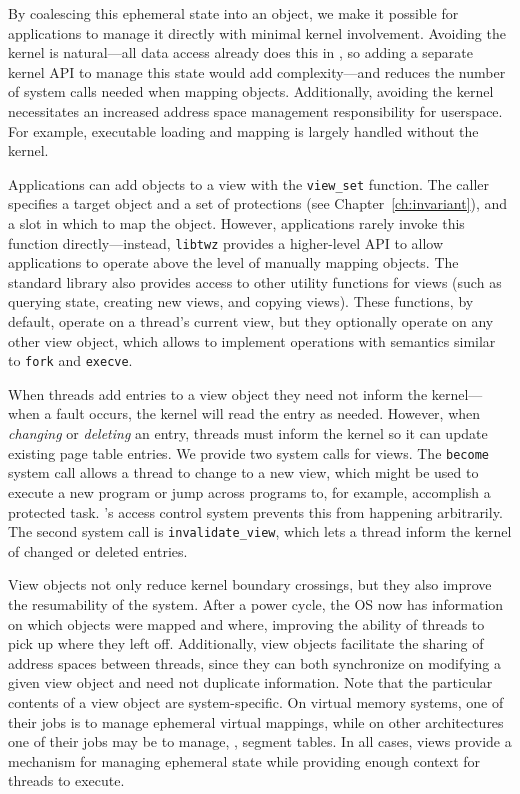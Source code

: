 By coalescing this ephemeral state
into an object, we make it possible for applications to manage it directly with minimal kernel
involvement. Avoiding the kernel is natural---all data access already does this in \Twizzler, so
adding a separate kernel API to manage this state would add complexity---and reduces the number of
system calls needed when mapping objects. Additionally, avoiding the kernel necessitates an
increased address space management responsibility for userspace. For example, executable loading
and mapping is largely handled without the kernel.

Applications can add objects to a view with the \texttt{view\_set} function. The caller specifies a
target object and a set of protections (see Chapter~\ref{ch:invariant}), and a slot in which to
map the object. However, applications rarely invoke this function directly---instead,
\texttt{libtwz} provides a higher-level API to allow applications to operate above the level of
manually mapping objects. The standard library also provides access to other utility functions for
views (such as querying state, creating new views, and copying views). These functions, by default,
operate on a thread's current view, but they optionally operate on any other view object,
which allows \Twizzler to implement operations with semantics similar to \texttt{fork} and \texttt{execve}.

When threads add entries to a view object they need not inform the kernel---when
a fault occurs, the kernel will read the entry as needed. However, when \emph{changing} or
\emph{deleting} an entry, threads must inform the kernel so it can update existing page table entries.
We provide two system calls for views. The \texttt{become} system call allows a thread to
change to a new view, which might be used to execute a new program or jump across programs to, for
example, accomplish a protected task. \Twizzler's access control system prevents this from happening
arbitrarily. The second system call is \texttt{invalidate\_view}, which lets a thread inform the
kernel of changed or deleted entries.

View objects not only reduce kernel boundary crossings, but they also improve the resumability of
the system. After a power cycle, the OS now has information on which objects were mapped and where,
improving the ability of threads to pick up where they left off. Additionally, view objects
facilitate the sharing of address spaces between threads, since they can both synchronize on
modifying a given view object and need not duplicate information. Note that the particular contents
of a view object are system-specific. On virtual memory systems, one of their jobs is to manage
ephemeral virtual mappings, while on other architectures one of their jobs may be to manage, \eg, segment
tables. In all cases, views provide a mechanism for managing ephemeral state while
providing enough context for threads to execute.

